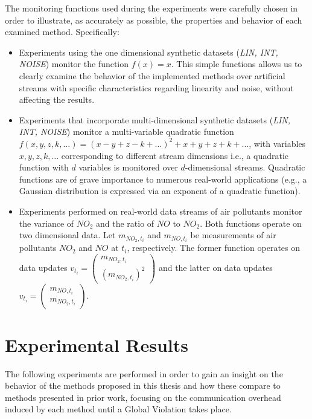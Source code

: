 The monitoring functions used during the experiments were carefully chosen in order to illustrate, as accurately as possible, the properties and behavior of each examined method. Specifically:
\begin{itemize}
\item Experiments using the one dimensional synthetic datasets (\emph{LIN, INT, NOISE}) monitor the function $f(x)=x$. This simple functions allows us to clearly examine the behavior of the implemented methods over artificial streams with specific characteristics regarding linearity and noise, without affecting the results.
\item Experiments that incorporate multi-dimensional synthetic datasets (\emph{LIN, INT, NOISE}) monitor a multi-variable quadratic function $f(x,y,z,k,\dots)=(x-y+z-k+\dots)^2+x+y+z+k+\dots$, with variables $x,y,z,k,\dots$ corresponding to different stream dimensions i.e., a quadratic function with $d$ variables is monitored over $d$-dimensional streams. Quadratic functions are of grave importance to numerous real-world applications (e.g., a Gaussian distribution is expressed via an exponent of a quadratic function).
\item Experiments performed on real-world data streams of air pollutants monitor the variance of $NO_2$ and the ratio of $NO$ to $NO_2$. Both functions operate on two dimensional data. Let $m_{NO_2,t_i}$ and $m_{NO,t_i}$ be measurements of air pollutants $NO_2$ and $NO$ at $t_i$, respectively. The former function operates on data updates $v_{t_i}=\left(\begin{smallmatrix}m_{NO_2,t_i}\\(m_{NO_2,t_i})^2\end{smallmatrix}\right)$ and the latter on data updates $v_{t_i}=\left(\begin{smallmatrix}m_{NO,t_i}\\m_{NO_2,t_i}\end{smallmatrix}\right)$.
\end{itemize}

\section{Experimental Results} \label{sec:exp}

The following experiments are performed in order to gain an insight on the behavior of the methods proposed in this thesis and how these compare to methods presented in prior work, focusing on the communication overhead induced by each method until a Global Violation takes place. 

